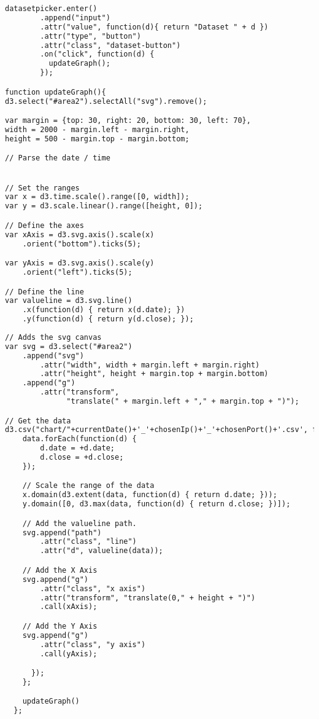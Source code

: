 \begin{lstlisting}[language=HTML]
      datasetpicker.enter()
        .append("input")
        .attr("value", function(d){ return "Dataset " + d })
        .attr("type", "button")
        .attr("class", "dataset-button")
        .on("click", function(d) {
          updateGraph();
        });

function updateGraph(){
d3.select("#area2").selectAll("svg").remove();

var margin = {top: 30, right: 20, bottom: 30, left: 70},
width = 2000 - margin.left - margin.right,
height = 500 - margin.top - margin.bottom;

// Parse the date / time


// Set the ranges
var x = d3.time.scale().range([0, width]);
var y = d3.scale.linear().range([height, 0]);

// Define the axes
var xAxis = d3.svg.axis().scale(x)
    .orient("bottom").ticks(5);

var yAxis = d3.svg.axis().scale(y)
    .orient("left").ticks(5);

// Define the line
var valueline = d3.svg.line()
    .x(function(d) { return x(d.date); })
    .y(function(d) { return y(d.close); });
    
// Adds the svg canvas
var svg = d3.select("#area2")
    .append("svg")
        .attr("width", width + margin.left + margin.right)
        .attr("height", height + margin.top + margin.bottom)
    .append("g")
        .attr("transform", 
              "translate(" + margin.left + "," + margin.top + ")");

// Get the data
d3.csv("chart/"+currentDate()+'_'+chosenIp()+'_'+chosenPort()+'.csv', function(error, data) {
    data.forEach(function(d) {
        d.date = +d.date;
        d.close = +d.close;
    });

    // Scale the range of the data
    x.domain(d3.extent(data, function(d) { return d.date; }));
    y.domain([0, d3.max(data, function(d) { return d.close; })]);

    // Add the valueline path.
    svg.append("path")
        .attr("class", "line")
        .attr("d", valueline(data));

    // Add the X Axis
    svg.append("g")
        .attr("class", "x axis")
        .attr("transform", "translate(0," + height + ")")
        .call(xAxis);

    // Add the Y Axis
    svg.append("g")
        .attr("class", "y axis")
        .call(yAxis);

      });
    };

    updateGraph()
  };


\end{lstlisting}
